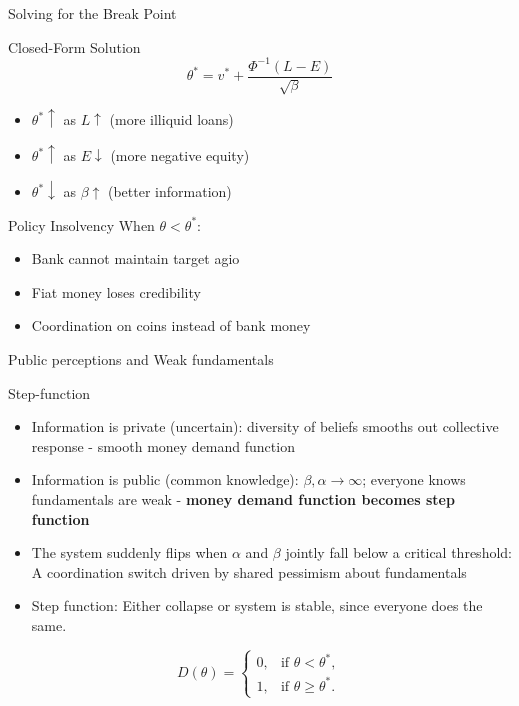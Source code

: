 \documentclass[aspectratio=169, xcolor=table]{beamer}
\begin{document}
\begin{frame}{Solving for the Break Point}
  \begin{block}{Closed-Form Solution}
    \[
      \theta^* = v^* + \frac{\Phi^{-1}(L - E)}{\sqrt{\beta}}
    \]
    \begin{itemize}
      \item $\theta^* \uparrow$ as $L \uparrow$ (more illiquid loans)
      \item $\theta^* \uparrow$ as $E \downarrow$ (more negative equity)
      \item $\theta^* \downarrow$ as $\beta \uparrow$ (better information)
    \end{itemize}
  \end{block}

  \begin{alertblock}{Policy Insolvency}
    When $\theta < \theta^*$:
    \begin{itemize}
      \item Bank cannot maintain target agio
      \item Fiat money loses credibility
      \item Coordination on coins instead of bank money
    \end{itemize}
  \end{alertblock}
\end{frame}



\begin{frame}{Public perceptions and Weak fundamentals}
  \begin{block}{Step-function}
    \begin{itemize}
      \item Information is private (uncertain): diversity of beliefs smooths out collective response - smooth money demand function
      \item Information is public (common knowledge): $\beta, \alpha \rightarrow \infty$; everyone knows fundamentals are weak -  \textbf{money demand function becomes step function}
      \item The system suddenly flips when $\alpha$ and $\beta$ jointly fall below a critical threshold: A coordination switch driven by shared pessimism about fundamentals
      \item Step function: Either collapse or system is stable, since everyone does the same.
    \end{itemize}
  \end{block}

  \[
    D(\theta) =
    \begin{cases}
      0, & \text{if } \theta < \theta^*,   \\[6pt]
      1, & \text{if } \theta \ge \theta^*.
    \end{cases}
  \]
\end{frame}
\end{document}
